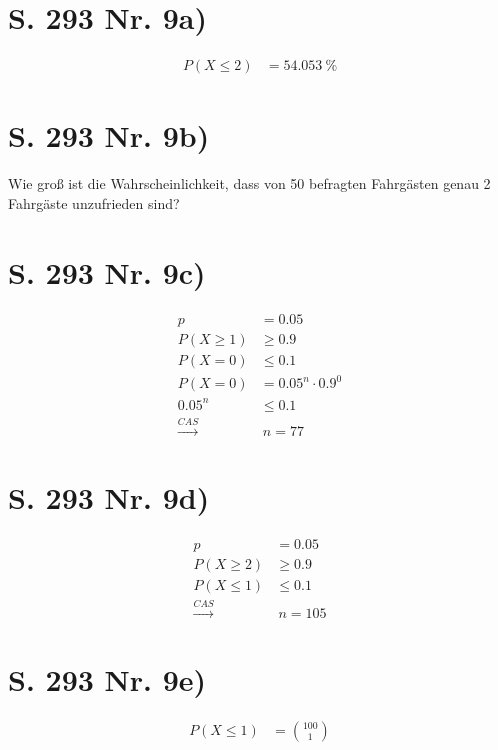 \documentclass[12pt,a4paper]{report}
\begin{document}
	\section{S. 293 Nr. 9a)}
	\begin{align*}
		P(X \leq 2) &= 54.053\ \%
	\end{align*}
	\section{S. 293 Nr. 9b)}
	Wie groß ist die Wahrscheinlichkeit, dass von 50 befragten Fahrgästen genau 2 Fahrgäste unzufrieden sind?
	\section{S. 293 Nr. 9c)}
	\begin{align*}
		p &= 0.05 \\
		P(X \geq 1) &\geq 0.9 \\
		P(X = 0) &\leq 0.1 \\
		P(X = 0) &= 0.05^{n} \cdot 0.9^0 \\
		0.05^n &\leq 0.1 \\
		\xrightarrow{CAS} &\ n = 77
	\end{align*}
	\section{S. 293 Nr. 9d)}
	\begin{align*}
		p &= 0.05 \\
		P(X \geq 2) &\geq 0.9 \\
		P(X \leq 1) &\leq 0.1 \\
		\xrightarrow{CAS} &\ n = 105
	\end{align*}
	\section{S. 293 Nr. 9e)}
	\begin{align*}
		P(X \leq 1) &= \binom{100}{1}
	\end{align*}
	
\end{document}
